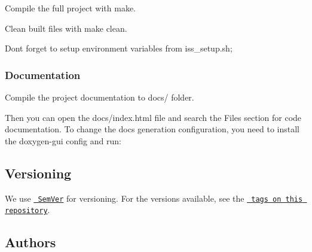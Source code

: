 \begin{DoxyItemize}
\item Compile the full project with {\ttfamily make}.
\item Clean built files with {\ttfamily make clean}.
\end{DoxyItemize}

Don\textquotesingle{}t forget to setup environment variables from {\ttfamily iss\+\_\+setup.\+sh};

\subsubsection*{Documentation}

Compile the project documentation to {\ttfamily docs/} folder. 
\begin{DoxyCode}{0}
\end{DoxyCode}


Then you can open the {\ttfamily docs/index.\+html} file and search the {\ttfamily Files} section for code documentation. To change the docs generation configuration, you need to install the {\ttfamily doxygen-\/gui} config and run\+: 
\begin{DoxyCode}{0}
\end{DoxyCode}


\subsection*{Versioning}

We use \href{http://semver.org/}{\texttt{ Sem\+Ver}} for versioning. For the versions available, see the \href{https://github.com/FranciscoKnebel/quansershield2/tags}{\texttt{ tags on this repository}}.

\subsection*{Authors}

